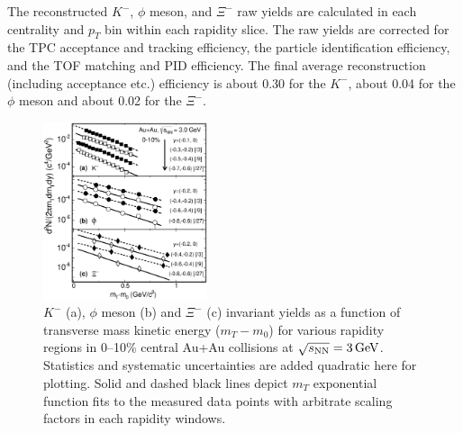 \documentclass[%
 reprint,	
showpacs,
 amsmath,amssymb,
 aps,
 superscriptaddress,
]{revtex4-1}
\begin{document}
The reconstructed $K^-$, $\phi$ meson, and $\Xi^-$ raw yields are calculated in each centrality and $p_{T}$ bin within each rapidity slice. 
The raw yields are corrected for the TPC acceptance and tracking efficiency, %
the particle identification efficiency, %
and the TOF matching and PID efficiency. The final average reconstruction (including acceptance etc.) efficiency is about 0.30 for the $K^-$, about 0.04 for the $\phi$ meson and about 0.02 for the $\Xi^-$.

\begin{figure}
\centering
\hspace*{-4mm}
\includegraphics[width=0.43\textwidth]{fig/fig2_h_mT_spectra_phiMeson.eps}
  \caption{ $K^-$ (a), $\phi$ meson (b) and $\Xi^-$ (c) invariant yields as a function of transverse mass kinetic energy ($m_T-m_0$) for various rapidity regions in 0--10\% central Au+Au collisions at ${\sqrt{s_{\rm NN}} = \rm{3\,GeV}}$. Statistics and systematic uncertainties are added quadratic here for plotting. Solid and dashed black lines depict $m_T$ exponential function fits to the measured data points with arbitrate scaling factors in each rapidity windows.}
\label{fig:phimTSpectra} 
\end{figure}
\end{document}
